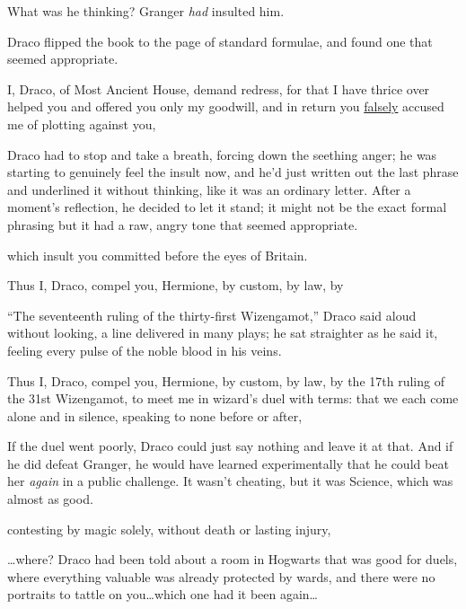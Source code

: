 What was he thinking? Granger \emph{had} insulted him.

Draco flipped the book to the page of standard formulae, and found one that
seemed appropriate.

\begin{writtenNote}
I, Draco, of Most Ancient House, demand redress, for that I have thrice
over helped you and offered you only my goodwill, and in return you
\underline{falsely} accused me of plotting against you,
\end{writtenNote}

Draco had to stop and take a breath, forcing down the seething anger; he was
starting to genuinely feel the insult now, and he’d just written out the last
phrase and underlined it without thinking, like it was an ordinary letter.
After a moment’s reflection, he decided to let it stand; it might not be the
exact formal phrasing but it had a raw, angry tone that seemed appropriate.

\begin{writtenNote}
which insult you committed before the eyes of Britain.

Thus I, Draco, compel you, Hermione, by custom, by law, by
\end{writtenNote}

“The seventeenth ruling of the thirty-first Wizengamot,” Draco said aloud
without looking, a line delivered in many plays; he sat straighter as he said
it, feeling every pulse of the noble blood in his veins.

\begin{writtenNote}
Thus I, Draco, compel you, Hermione, by custom, by law, by the 17th
ruling of the 31st Wizengamot, to meet me in wizard’s duel with terms: that we
each come alone and in silence, speaking to none before or after,
\end{writtenNote}

If the duel went poorly, Draco could just say nothing and leave it at that. And
if he did defeat Granger, he would have learned experimentally that he could
beat her \emph{again} in a public challenge. It wasn’t cheating, but it was
Science, which was almost as good.

\begin{writtenNote}
contesting by magic solely, without death or lasting injury,
\end{writtenNote}

…where? Draco had been told about a room in Hogwarts that was good for
duels, where everything valuable was already protected by wards, and there were
no portraits to tattle on you…which one had it been again…

